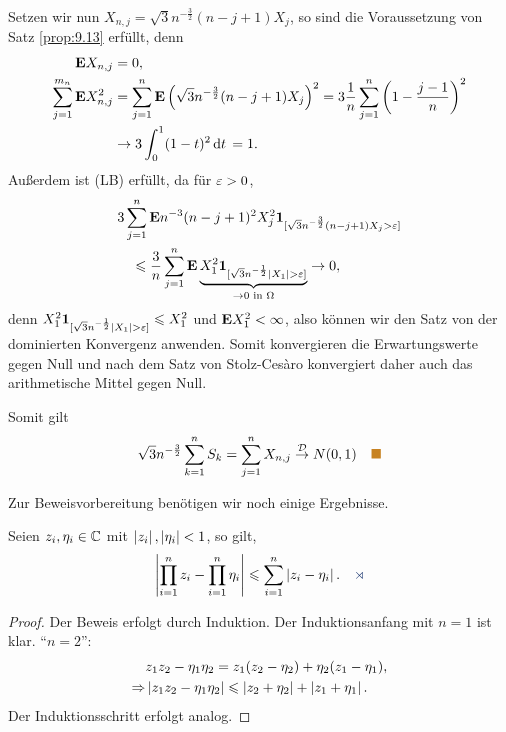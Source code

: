 \begin{bsp}
Setzen wir nun $X_{n,j} = \sqrt{3}n^{-\frac{3}{2}}(n-j+1)X_j$, so sind die
Voraussetzung von Satz \ref{prop:9.13} erfüllt, denn
\begin{align*}
\textbf{E} X_{n,j} &= 0,\\
\sum_{j=1}^{m_n}\textbf{E} X_{n,j}^2
&=\sum_{j=1}^{n} \textbf{E}\left(\sqrt{3}n^{-\frac{3}{2}} (n-j+1) X_j\right)^2
=3 \frac{1}{n}\sum_{j=1}^n\left(1-\frac{j-1}{n}\right)^2\\
&\to 3 \int_0^1(1-t)^2\,\mathrm{d} t\, = 1.
\end{align*}
Außerdem ist (LB) erfüllt, da für $\varepsilon > 0$,
\begin{align*}
&3\sum_{j=1}^n \E n^{-3}(n-j+1)^2 X_j^2\Id_{[\sqrt{3}n^{-\frac{3}{2}}
(n-j+1)X_j>\ep]}\\
&\quad\le \frac{3}{n}\sum\limits_{j=1}^n \E
\underbrace{X_1^2\Id_{[\sqrt{3}n^{-\frac{1}{2}}\abs{X_1}>\ep]}}_{\to 0\text{ in
}\Omega} \to 0,
\end{align*}
denn $X_1^2\Id_{[\sqrt{3}n^{-\frac{1}{2}}\abs{X_1}>\ep]} \le X_1^2$ und $\textbf{E}
X_1^2 < \infty$, also können wir den Satz von der dominierten Konvergenz
anwenden. Somit konvergieren die Erwartungswerte gegen Null und nach dem Satz
von Stolz-Cesàro konvergiert daher auch das arithmetische Mittel gegen Null.

Somit gilt
\begin{align*}
\sqrt{3}n^{-\frac{3}{2}} \sum_{k=1}^n S_k = \sum_{j=1}^n X_{n,j} \Dto
N(0,1)\bsphere
\end{align*}
\end{bsp}

Zur Beweisvorbereitung benötigen wir noch einige Ergebnisse.

\begin{lemn}
Seien $z_i,\eta_i \in\mathbb{C}$ mit $\left|z_i\right|,\left|\eta_i\right| < 1$, so gilt,
\begin{align*}
\abs{\prod_{i=1}^n z_i - \prod_{i=1}^n \eta _i} \le \sum_{i=1}^n
\abs{z_i-\eta_i}.\fishhere
\end{align*}
\end{lemn}
\begin{proof}
Der Beweis erfolgt durch Induktion. Der Induktionsanfang mit $n=1$ ist klar.
``$n=2$'':
\begin{align*}
&z_1z_2 - \eta_1\eta_2 = z_1(z_2-\eta_2)+\eta_2(z_1-\eta_1),\\
\Rightarrow &\left|z_1z_2 - \eta_1\eta_2\right| \leqslant \left|z_2+\eta_2\right| +
\left|z_1+\eta_1\right|.
\end{align*}
Der Induktionsschritt erfolgt analog.\qedhere
\end{proof}

